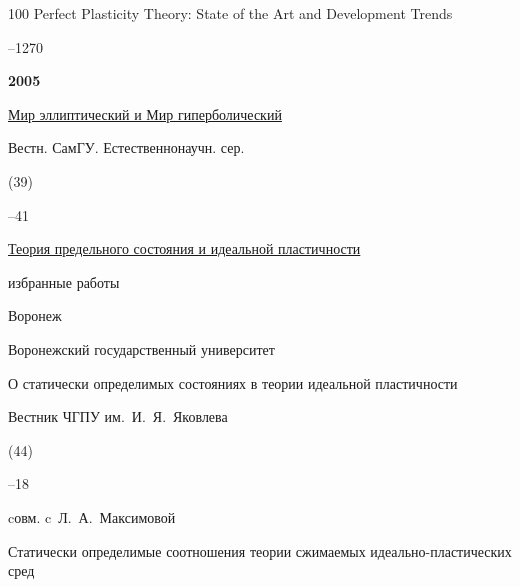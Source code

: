 \begin{thebibliography}{100}
\paper Perfect Plasticity Theory: State of the Art and Development Trends


--1270 






\item[] \centerline{\bf 2005}




\paper \href{http://elibrary.ru/item.asp?id=9117000}{Мир эллиптический и Мир гиперболический}

\jour Вестн. СамГУ. Естественнонаучн. сер.


(39)

–41






\book \href{http://elibrary.ru/item.asp?id=19448142}{Теория предельного состояния и идеальной пластичности}

\bookinfo избранные работы

\publaddr Воронеж

\publ Воронежский государственный университет







\paper О статически определимых состояниях в теории идеальной пластичности 

\jour Вестник ЧГПУ им.~И.~Я.~Яковлева


(44)

–18 

\miscnote cовм. c~Л.~А.~Максимовой




\paper Статически определимые соотношения теории сжимаемых идеально-пластических сред 


\end{thebibliography}
